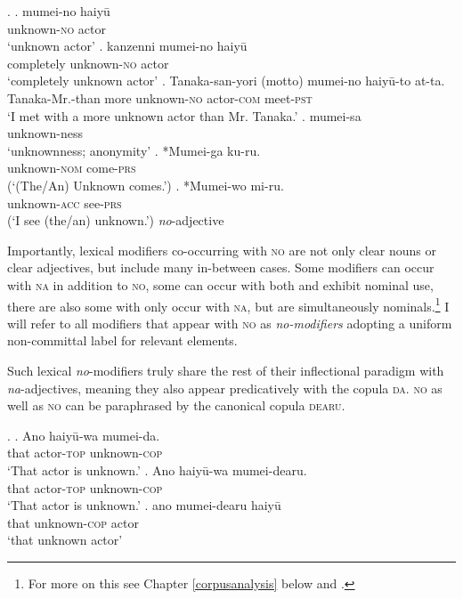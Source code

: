 \documentclass [output=book,colorlinks,citecolor=brown]{langscibook}
\begin{document}
\ex. \ag. mumei-no haiyū\\
unknown-\textsc{no} actor\\
`unknown actor'
\bg. kanzenni mumei-no haiyū\\
completely unknown-\textsc{no} actor\\
`completely unknown actor' \label{kanzennimumei}
\cg. Tanaka-san-yori (motto) mumei-no haiyū-to at-ta.\\
Tanaka-Mr.-than more unknown-\textsc{no} actor-\textsc{com} meet-\textsc{pst}\\
`I met with a more unknown actor than Mr. Tanaka.’ \label{yorimumei}
\dg. mumei-sa\\
unknown-ness\\
`unknownness; anonymity’ \label{mumeisa}
\eg. *Mumei-ga ku-ru.\\
unknown-\textsc{nom} come-\textsc{prs}\\
(`(The/An) Unknown comes.’) \label{mumei-ga}
\fg. *Mumei-wo mi-ru.\\
unknown-\textsc{acc} see-\textsc{prs}\\
(`I see (the/an) unknown.’) \null \hfill \textit{no}-adjective \label{mumei-wo}

Importantly, lexical modifiers co-occurring with \textsc{no} are not only clear nouns or clear adjectives, but include many in-between cases. Some modifiers can occur with \textsc{na} in addition to \textsc{no}, some can occur with both and exhibit nominal use, there are also some with only occur with \textsc{na}, but are simultaneously nominals.\footnote{For more on this see Chapter \ref{corpusanalysis} below and \citet{kohlich:2023:suppl}.} I will refer to all modifiers that appear with \textsc{no} as \textit{\textit{no}-modifiers} adopting a uniform non-committal label for relevant elements.

Such lexical \textit{no}-modifiers truly share the rest of their inflectional paradigm with \textit{na}-adjectives, meaning they also appear predicatively with the copula \textsc{da}. \textsc{no} as well as \textsc{no} can be paraphrased by the canonical copula \textsc{dearu}.

\ex. \ag. Ano haiyū-wa mumei-da.\\
that actor-\textsc{top} unknown-\textsc{cop}\\
`That actor is unknown.’
\bg. Ano haiyū-wa mumei-dearu.\\
that actor-\textsc{top} unknown-\textsc{cop}\\
`That actor is unknown.’
\cg. ano mumei-dearu haiyū\\
that unknown-\textsc{cop} actor\\
`that unknown actor’
\end{document}
